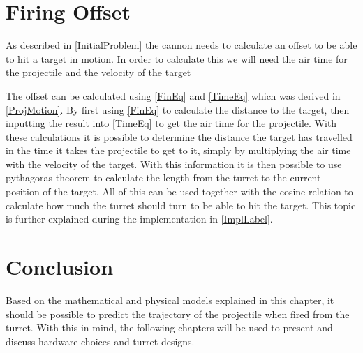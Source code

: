 \section{Firing Offset}
As described in \autoref{InitialProblem} the cannon needs to calculate an
offset to be able to hit a target in motion. In order to calculate this we will
need the air time for the projectile and the velocity of the target\nl

The offset can be calculated using \autoref{FinEq} and \autoref{TimeEq} which
was derived in \autoref{ProjMotion}. By first using \autoref{FinEq} to
calculate the distance to the target, then inputting the result into
\autoref{TimeEq} to get the air time for the projectile. With these calculations
it is possible to determine the distance the target has travelled in the time it
takes the projectile to get to it, simply by multiplying the air time with the
velocity of the target. With this information it is then possible to use
pythagoras theorem to calculate the length from the turret to the current
position of the target. All of this can be used together with the cosine
relation to calculate how much the turret should turn to be able to hit the
target. This topic is further explained during the implementation in
\autoref{ImplLabel}.

\section{Conclusion}
Based on the mathematical and physical models explained in this chapter, it
should be possible to predict the trajectory of the projectile when fired from
the turret. With this in mind, the following chapters will be used to present
and discuss hardware choices and turret designs.
